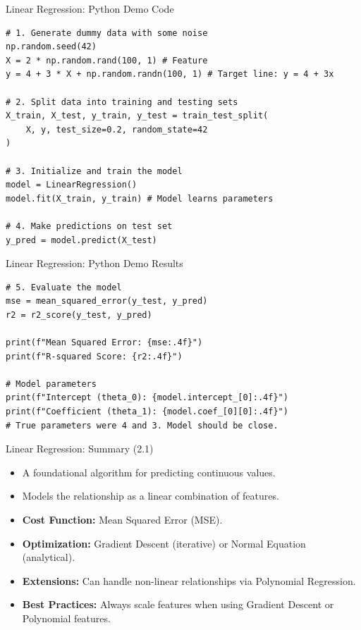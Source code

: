\documentclass[aspectratio=169]{beamer}
\begin{document}
\begin{frame}[fragile]{Linear Regression: Python Demo Code}
\begin{verbatim}
# 1. Generate dummy data with some noise
np.random.seed(42)
X = 2 * np.random.rand(100, 1) # Feature
y = 4 + 3 * X + np.random.randn(100, 1) # Target line: y = 4 + 3x

# 2. Split data into training and testing sets
X_train, X_test, y_train, y_test = train_test_split(
    X, y, test_size=0.2, random_state=42
)

# 3. Initialize and train the model
model = LinearRegression()
model.fit(X_train, y_train) # Model learns parameters

# 4. Make predictions on test set
y_pred = model.predict(X_test)
\end{verbatim}
\end{frame}

\begin{frame}[fragile]{Linear Regression: Python Demo Results}
\begin{verbatim}
# 5. Evaluate the model
mse = mean_squared_error(y_test, y_pred)
r2 = r2_score(y_test, y_pred)

print(f"Mean Squared Error: {mse:.4f}")
print(f"R-squared Score: {r2:.4f}")

# Model parameters
print(f"Intercept (theta_0): {model.intercept_[0]:.4f}")
print(f"Coefficient (theta_1): {model.coef_[0][0]:.4f}")
# True parameters were 4 and 3. Model should be close.
\end{verbatim}
\end{frame}

\begin{frame}{Linear Regression: Summary (2.1)}
    \begin{itemize}
        \item A foundational algorithm for predicting continuous values.
        \item Models the relationship as a linear combination of features.
        \item \textbf{Cost Function:} Mean Squared Error (MSE).
        \item \textbf{Optimization:} Gradient Descent (iterative) or Normal Equation (analytical).
        \item \textbf{Extensions:} Can handle non-linear relationships via Polynomial Regression.
        \item \textbf{Best Practices:} Always scale features when using Gradient Descent or Polynomial features.
    \end{itemize}
\end{frame}
\end{document}
